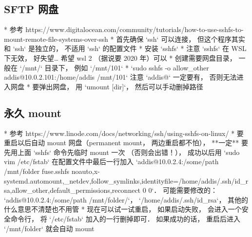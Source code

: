 
\subsection{SFTP 网盘}
\begin{itemize}
* 参考 https://www.digitalocean.com/community/tutorials/how-to-use-sshfs-to-mount-remote-file-systems-over-ssh
* 首先确保 `ssh` 可以连接， 但这个程序其实和 `ssh` 是独立的， 不适用 `ssh` 的配置文件
* 安装 `sshfs`
* 注意 `sshfs` 在 WSL 下无效， 好失望… 希望 wsl 2 （据说要 2020 年）可以
* 创建需要网盘目录， 一般在 `/mnt/` 目录下， 例如 `/mnt/101`
* `sudo sshfs -o allow_other addis@10.0.2.101:/home/addis /mnt/101` 注意 `addis@` 一定要有， 否则无法进入网盘
* 要弹出网盘， 用 `umount [dir]`， 然后可以手动删掉路径
\end{itemize}

\subsection{永久 mount}
\begin{itemize}
* 参考 https://www.linode.com/docs/networking/ssh/using-sshfs-on-linux/
* 要重启以后自动 mount 网盘（permanent mount， 两边重启都不怕）， **一定** 要先用上面 `sshfs` 命令先临时 mount 一次 （否则会出错！）， 成功以后用 `sudo vim /etc/fstab` 在配置文件中最后一行加入 `addis@10.0.2.4:/some/path /mnt/folder  fuse.sshfs noauto,x-systemd.automount,_netdev,follow_symlinks,identityfile=/home/addis/.ssh/id_rsa,allow_other,default_permissions,reconnect 0 0`． 可能需要修改的： `addis@10.0.2.4:/some/path /mnt/folder/`， `/home/addis/.ssh/id_rsa`， 其他的什么意思不清楚也不用管
* 现在可以试一试重启， 如果启动失败， 会进入一个安全命令行， 将 `/etc/fstab` 加入的一行删掉即可． 如果成功的话， 重启后进入 `/mnt/folder` 就会自动 mount
\end{itemize}